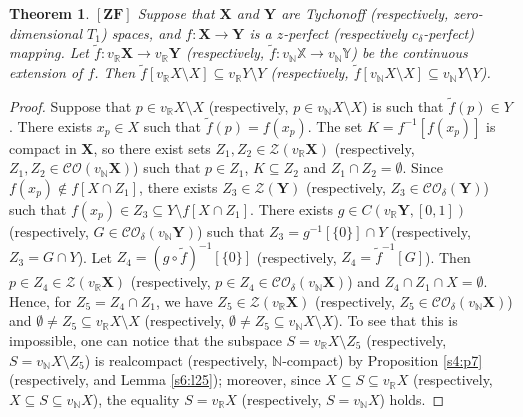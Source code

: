 \documentclass[12pt,twoside,leqno]{article}
\theoremstyle{plain}
\newtheorem{theorem}{Theorem}[section]
\theoremstyle{definition}
\theoremstyle{remark}
\begin{document}
\begin{theorem}
	\label{s6:t26}
	$[\mathbf{ZF}]$ Suppose that $\mathbf{X}$ and $\mathbf{Y}$ are Tychonoff (respectively, zero-dimension\-al $T_1$) spaces, and $f:\mathbf{X}\to\mathbf{Y}$ is a $z$-perfect (respectively $c_{\delta}$-perfect) mapping. Let $\tilde{f}: v_{\mathbb{R}}\mathbf{X}\to v_{\mathbb{R}}\mathbf{Y}$ (respectively, $\tilde{f}:v_{\mathbb{N}}\mathbb{X}\to v_{\mathbb{N}}\mathbb{Y}$) be the continuous extension of $f$. Then $\tilde{f}[v_{\mathbb{R}}X\setminus X]\subseteq v_{\mathbb{R}}Y\setminus Y$ (respectively, $\tilde{f}[v_{\mathbb{N}}X\setminus X]\subseteq v_{\mathbb{N}}Y\setminus Y$).
\end{theorem}
\begin{proof}
	
	Suppose that $p\in v_{\mathbb{R}}X\setminus X$ (respectively, $p\in v_{\mathbb{N}}X\setminus X$) is such that $\tilde{f}(p)\in Y$. There exists $x_p\in X$ such that $\tilde{f}(p)=f(x_p)$. The set $K=f^{-1}[f(x_p)]$ is compact in $\mathbf{X}$, so there exist sets $Z_1, Z_2\in\mathcal{Z}(v_{\mathbb{R}}\mathbf{X})$ (respectively, $Z_1, Z_2\in \mathcal{CO}(v_{\mathbb{N}}\mathbf{X})$) such that $p\in Z_1$, $K\subseteq Z_2$ and $Z_1\cap Z_2=\emptyset$. Since $f(x_p)\notin f[X\cap Z_1]$, there exists $Z_3\in\mathcal{Z}(\mathbf{Y})$ (respectively, $Z_3\in\mathcal{CO}_{\delta}(\mathbf{Y})$) such that $f(x_p)\in Z_3\subseteq Y\setminus f[X\cap Z_1]$. There exists $g\in C(v_{\mathbb{R}}\mathbf{Y}, [0, 1])$ (respectively, $G\in \mathcal{CO}_{\delta}(v_{\mathbb{N}}\mathbf{Y})$) such that $Z_3=g^{-1}[\{0\}]\cap Y$ (respectively, $Z_3=G\cap Y$). Let $Z_4=(g\circ \tilde{f})^{-1}[\{0\}]$ (respectively, $Z_4=\tilde{f}^{-1}[G]$).  Then $p\in Z_4\in\mathcal{Z}(v_{\mathbb{R}}\mathbf{X})$ (respectively, $p\in Z_4\in\mathcal{CO}_{\delta}(v_{\mathbb{N}}\mathbf{X})$) and $Z_4\cap Z_1\cap X=\emptyset$. Hence, for $Z_5=Z_4\cap Z_1$, we have $Z_5\in\mathcal{Z}(v_{\mathbb{R}}\mathbf{X})$ (respectively, $Z_5\in\mathcal{CO}_{\delta}(v_{\mathbb{N}}\mathbf{X})$) and $\emptyset\neq Z_5\subseteq v_{\mathbb{R}}X\setminus X$ (respectively, $\emptyset\neq Z_5\subseteq v_{\mathbb{N}}X\setminus X$).  To see that this is impossible, one can notice that the subspace $S=v_{\mathbb{R}}X\setminus Z_5$ (respectively, $S=v_{\mathbb{N}}X\setminus Z_5$) is realcompact (respectively, $\mathbb{N}$-compact) by Proposition \ref{s4:p7} (respectively, and Lemma \ref{s6:l25}); moreover, since $X\subseteq S\subseteq v_{\mathbb{R}}X$ (respectively, $X\subseteq S\subseteq v_{\mathbb{N}}X$), the equality $S=v_{\mathbb{R}}X$ (respectively, $S=v_{\mathbb{N}}X$) holds. 
\end{proof}
\end{document}
